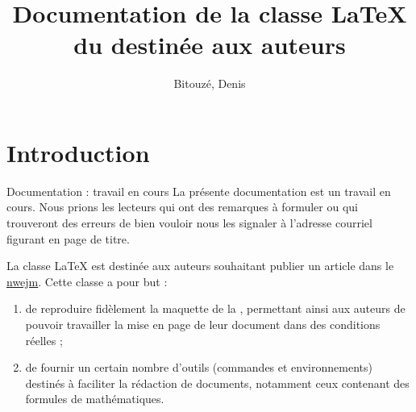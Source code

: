 \documentclass[french,nolocaltoc]{nwejmart}
\newtheorem[title=Fait,style=definition]{fact}
\begin{document}
\title[Documentation de la classe \LaTeX{} du
\texorpdfstring{\nwejm}{NWEJM}]{Documentation de la classe \LaTeX{} du \nwejm*{}
  destinée aux auteurs}
%
\author[%
affiliation={%
  Université du Littoral Côte d'Opale, Laboratoire de mathématiques pures et
  appliquées (\nolinkurl{denis.bitouze@lmpa.univ-littoral.fr})%
},%
]{Bitouzé, Denis}
%
\maketitle
%
\etocarticlestylenomarks
\localtableofcontents
%

\section{Introduction}
\label{sec-introduction}

\begin{dbremark}{Documentation : travail en cours}{}
  La présente documentation est un travail en cours. Nous prions les lecteurs
  qui ont des remarques à formuler ou qui trouveront des erreurs de bien vouloir
  nous les signaler à l'adresse courriel figurant en page de titre.
\end{dbremark}

La classe \LaTeX{} \nwejmauthor{} est destinée aux auteurs souhaitant publier un
article dans le \href{http://math.univ-lille1.fr/~nwejm/}{\gls{nwejm}}. Cette
classe a pour but :
\begin{enumerate}
\item de reproduire fidèlement la maquette de la \nwejm{}, permettant ainsi
  aux auteurs de pouvoir travailler la mise en page de leur document dans des
  conditions réelles ;
\item de fournir un certain nombre d'outils (commandes et environnements)
  destinés à faciliter la rédaction de documents, notamment ceux contenant des
  formules de mathématiques.
\end{enumerate}
\end{document}
